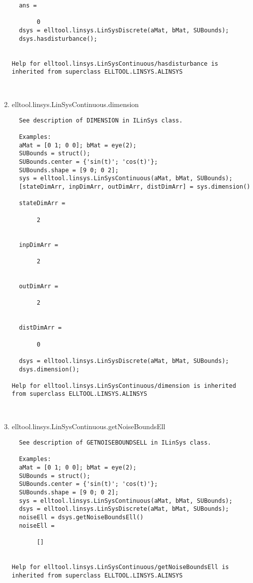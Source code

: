 \begin{enumerate}
\begin{lstlisting}
  ans =

       0
  dsys = elltool.linsys.LinSysDiscrete(aMat, bMat, SUBounds);
  dsys.hasdisturbance();


Help for elltool.linsys.LinSysContinuous/hasdisturbance is inherited from superclass ELLTOOL.LINSYS.ALINSYS



\end{lstlisting}
\fontfamily{\familydefault}
\selectfont
\item {elltool.linsys.LinSysContinuous.dimension}
\selectfont
\begin{lstlisting}
  See description of DIMENSION in ILinSys class.

  Examples:
  aMat = [0 1; 0 0]; bMat = eye(2);
  SUBounds = struct();
  SUBounds.center = {'sin(t)'; 'cos(t)'};
  SUBounds.shape = [9 0; 0 2];
  sys = elltool.linsys.LinSysContinuous(aMat, bMat, SUBounds);
  [stateDimArr, inpDimArr, outDimArr, distDimArr] = sys.dimension()

  stateDimArr =

       2


  inpDimArr =

       2


  outDimArr =

       2


  distDimArr =

       0

  dsys = elltool.linsys.LinSysDiscrete(aMat, bMat, SUBounds);
  dsys.dimension();

Help for elltool.linsys.LinSysContinuous/dimension is inherited from superclass ELLTOOL.LINSYS.ALINSYS



\end{lstlisting}
\fontfamily{\familydefault}
\selectfont
\item {elltool.linsys.LinSysContinuous.getNoiseBoundsEll}
\selectfont
\begin{lstlisting}
  See description of GETNOISEBOUNDSELL in ILinSys class.

  Examples:
  aMat = [0 1; 0 0]; bMat = eye(2);
  SUBounds = struct();
  SUBounds.center = {'sin(t)'; 'cos(t)'};
  SUBounds.shape = [9 0; 0 2];
  sys = elltool.linsys.LinSysContinuous(aMat, bMat, SUBounds);
  dsys = elltool.linsys.LinSysDiscrete(aMat, bMat, SUBounds);
  noiseEll = dsys.getNoiseBoundsEll()
  noiseEll =

       []


Help for elltool.linsys.LinSysContinuous/getNoiseBoundsEll is inherited from superclass ELLTOOL.LINSYS.ALINSYS




\end{lstlisting}
\end{enumerate}

